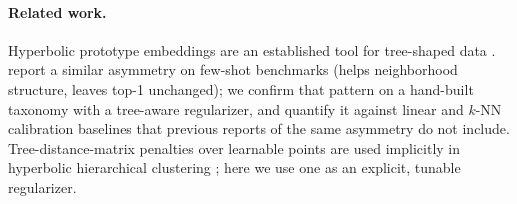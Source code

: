 \paragraph{Related work.} Hyperbolic prototype embeddings are an
established tool for tree-shaped data
\citep{nickel2017poincare,sala2018representation,ganea2018hyperbolic}.
\citet{khrulkov2020hyperbolic} report a similar asymmetry on
few-shot benchmarks (helps neighborhood structure, leaves top-1
unchanged); we confirm that pattern on a hand-built taxonomy with a
tree-aware regularizer, and quantify it against linear and $k$-NN
calibration baselines that previous reports of the same asymmetry do
not include. Tree-distance-matrix penalties over learnable points are
used implicitly in hyperbolic hierarchical clustering
\citep{chami2020trees}; here we use one as an explicit, tunable
regularizer.

